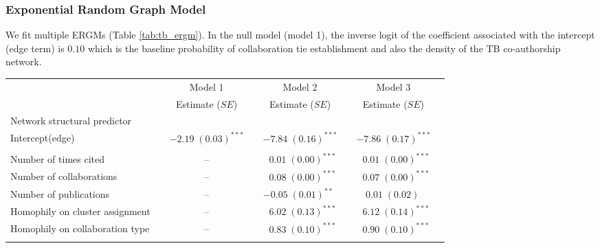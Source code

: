 \subsubsection{Exponential Random Graph Model}
\label{sec:tb_results_ergm}
We fit multiple ERGMs (Table \ref{tab:tb_ergm}). In the null model (model 1), the inverse logit of the coefficient associated with the intercept (edge term) is $0.10$ which is the baseline probability of collaboration tie establishment and also the density of the TB co-authorship network.

\begin{table}
\begin{center}
\hspace*{-1cm}
\small
\begin{tabular}{@{}lcclclcl@{}}
\toprule
           &  & Model 1 &  & Model 2  &  & Model 3\\ \cmidrule{3-3} \cmidrule{5-5} \cmidrule{7-7}            &  & Estimate ($SE$) &  & Estimate ($SE$)  &  & Estimate ($SE$) \\ \midrule
           Network structural predictor &  &   &  &  &  \\
\hspace{10pt}Intercept(edge) & & $-2.19 \; (0.03)^{***}$ & & $-7.84 \; (0.16)^{***}$ & & $-7.86 \; (0.17)^{***}$ \\ \\
Number of times cited        & &       --  & & $\hspace{6pt}0.01 \; (0.00)^{***}$ &  & $\hspace{6pt}0.01 \; (0.00)^{***}$  \\
Number of collaborations     & &  --  & & $\hspace{6pt}0.08 \; (0.00)^{***}$ &  & $\hspace{6pt}0.07 \; (0.00)^{***}$  \\
Number of publications       & &  --  & & $-0.05 \; (0.01)^{**~~}$ &  & $\hspace{6pt}0.01 \; (0.02)^{~~~~}$   \\
Homophily on cluster assignment &  &   --  &  & $\hspace{6pt}6.02 \; (0.13)^{***}$ &  & $\hspace{6pt}6.12 \; (0.14)^{***}$  \\
Homophily on collaboration type   &   & -- &   & $\hspace{6pt}0.83 \; (0.10)^{***}$ &  & $\hspace{6pt}0.90 \; (0.10)^{***}$  \\ \\

\end{tabular}
\end{center}
\end{table}
